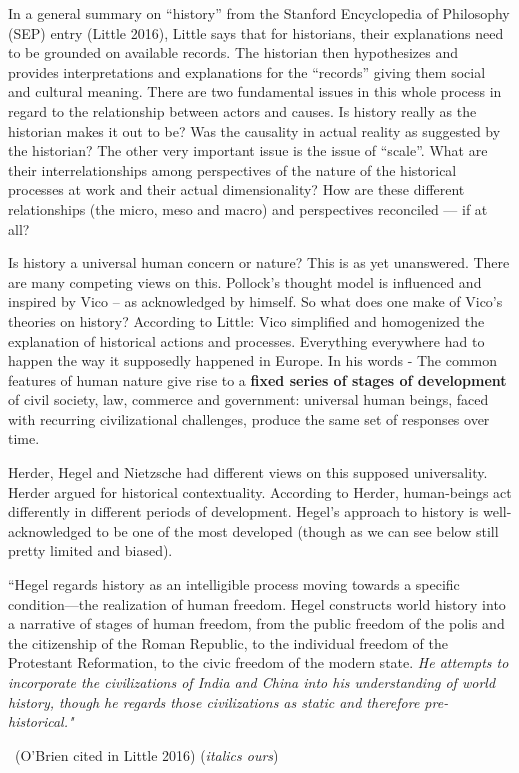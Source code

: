 In a general summary on “history” from the Stanford Encyclopedia of Philosophy (SEP) entry (Little 2016), Little says that for historians, their explanations need to be grounded on available records. The historian then hypothesizes and provides interpretations and explanations for the “records” giving them social and cultural meaning. There are two fundamental issues in this whole process in regard to the relationship between actors and causes. Is history really as the historian makes it out to be? Was the causality in actual reality as suggested by the historian? The other very important issue is the issue of “scale”. What are their interrelationships among perspectives of the nature of the historical processes at work and their actual dimensionality? How are these different relationships (the micro, meso and macro) and perspectives reconciled — if at all?

Is history a universal human concern or nature? This is as yet unanswered. There are many competing views on this. Pollock’s thought model is influenced and inspired by Vico – as acknowledged by himself. So what does one make of Vico’s theories on history? According to Little: Vico simplified and homogenized the explanation of historical actions and processes. Everything everywhere had to happen the way it supposedly happened in Europe. In his words - The common features of human nature give rise to a \textbf{fixed series of stages of development} of civil society, law, commerce and government: universal human beings, faced with recurring civilizational challenges, produce the same set of responses over time.

Herder, Hegel and Nietzsche had different views on this supposed universality. Herder argued for historical contextuality. According to Herder, human-beings act differently in different periods of development. Hegel's approach to history is well-acknowledged to be one of the most developed (though as we can see below still pretty limited and biased).

\begin{myquote}
“Hegel regards history as an intelligible process moving towards a specific condition—the realization of human freedom. Hegel constructs world history into a narrative of stages of human freedom, from the public freedom of the polis and the citizenship of the Roman Republic, to the individual freedom of the Protestant Reformation, to the civic freedom of the modern state. \textit{He attempts to incorporate the civilizations of India and China into his understanding of world history, though he regards those civilizations as static and therefore pre-historical."} 

~\hfill (O'Brien cited in Little 2016) (\textit{italics ours})
\end{myquote}

